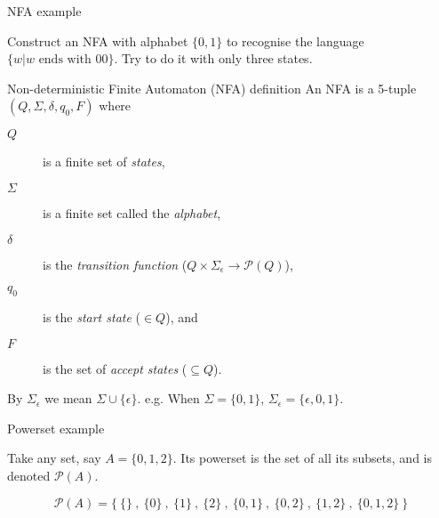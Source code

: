 \begin{frame}[fragile]{NFA example}
  \begin{center}
    Construct an NFA with alphabet $\{0, 1\}$ to recognise the language $\{ w| w \textrm{ ends with } 00\}$. Try to do it with only three states.
  \end{center}
  \begin{center}
  \end{center}
\end{frame}


\begin{frame}[fragile]{Non-deterministic Finite Automaton (NFA) definition}
  An NFA is a 5-tuple $(Q,\Sigma,\delta,q_0,F)$ where
  \begin{description}
    \item[$Q$] is a finite set of \emph{states},
    \item[$\Sigma$] is a finite set called the \emph{alphabet},
    \item[$\delta$] is the \emph{transition function} ($Q \times \Sigma_{\epsilon} \rightarrow \mathcal{P}(Q)$),
    \item[$q_0$] is the \emph{start state} ($\in Q$), and
    \item[$F$] is the set of \emph{accept states} ($\subseteq Q$). 
  \end{description}
  \vspace{5mm}
  By $\Sigma_{\epsilon}$ we mean $\Sigma \cup \{ \epsilon \}$.
  e.g. When $\Sigma = \{0,1\}$, $\Sigma_{\epsilon} = \{\epsilon,0,1\}.$
\end{frame}

\begin{frame}[fragile]{Powerset example}

  Take any set, say $A = \{0,1,2\}$.
  Its powerset is the set of all its subsets, and is denoted $\mathcal{P}(A)$.


  $$
  \mathcal{P}(A) = \Big\{ \ 
                      \{ \} \  , \  \{ 0 \} \  , \  \{ 1 \} \  ,\   \{ 2 \} \  , \ 
                      \{ 0,1 \} \  , \  \{ 0,2 \} \  , \  \{ 1,2 \} \  , \ 
                      \{ 0,1,2 \} \ 
                    \Big\}
  $$


\end{frame}